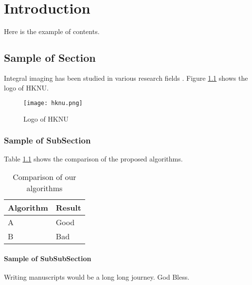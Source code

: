 \chapter{Introduction}
Here is the example of contents.
\section{Sample of Section}
Integral imaging has been studied in various research fields .
Figure \ref{fig:logo} shows the logo of HKNU.
\begin{figure}[htbp]
	\centering
	\texttt{[image: hknu.png]}
	\caption{Logo of HKNU}
	\label{fig:logo}
\end{figure}

\subsection{Sample of SubSection}
Table \ref{tab:comp_algorithm} shows the comparison of the proposed algorithms.
\begin{table}[htbp]
	\centering
	\caption{Comparison of our algorithms}
	\begin{tabular}{ll}
		\toprule
		\textbf{Algorithm} & \textbf{Result} \\
		\midrule
		A                  & Good            \\
		B                  & Bad             \\
		\bottomrule
	\end{tabular}%
	\label{tab:comp_algorithm}%
\end{table}%

\subsubsection{Sample of SubSubSection}
Writing manuscripts would be a long long journey. God Bless.
